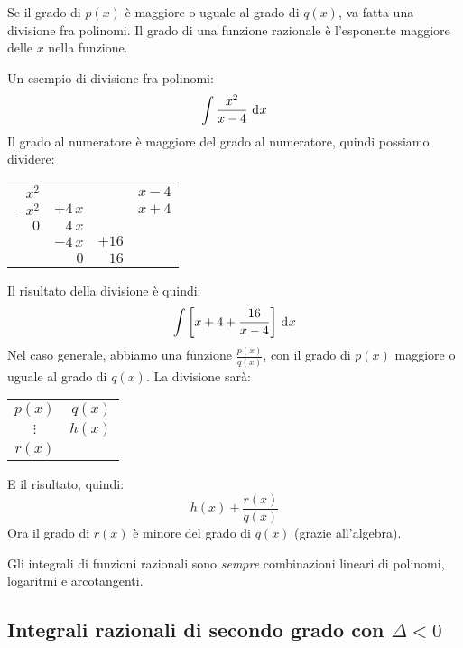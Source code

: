 Se il grado di $p(x)$ \`e maggiore o uguale al grado di $q(x)$,
va fatta una divisione fra polinomi. Il grado di una funzione 
razionale \`e l'esponente maggiore delle $x$ nella funzione.

Un esempio di divisione fra polinomi:
\[
\int \frac{x^2}{x - 4} \dx
\]
Il grado al numeratore \`e maggiore del grado al numeratore, quindi
possiamo dividere:
\begin{center}
\begin{tabular}{rrr|r}
$x^2$ & & & $x - 4$ \\ \cline{4-4}
$-x^2$ & $+4 \, x$ & & $x + 4$ \\ \cline{1-2}
$0$ & $4 \, x$ & & \\
& $- 4 \, x$ & $+ 16$ & \\ \cline{2-3}
& $0$ & $16$ & 
\end{tabular}
\end{center}
Il risultato della divisione \`e quindi:
\[
\int \left[ x + 4 + \frac{16}{x-4} \right] \dx 
\]
Nel caso generale, abbiamo una funzione $\frac{p(x)}{q(x)}$, con il grado 
di $p(x)$ maggiore o uguale al grado di $q(x)$. La divisione sar\`a:
\begin{center}
\begin{tabular}{c|r}
$p(x)$ & $q(x)$ \\ \cline{2-2}
$\vdots$ & $h(x)$ \\ \cline{1-1}
$r(x)$ & 
\end{tabular}
\end{center}
E il risultato, quindi:
\[
h(x) + \frac{r(x)}{q(x)}
\]
Ora il grado di $r(x)$ \`e minore del grado di $q(x)$ (grazie all'algebra).

Gli integrali di funzioni razionali sono \emph{sempre} combinazioni 
lineari di polinomi, logaritmi e arcotangenti.

\subsection{Integrali razionali di secondo grado con $\Delta < 0$}

